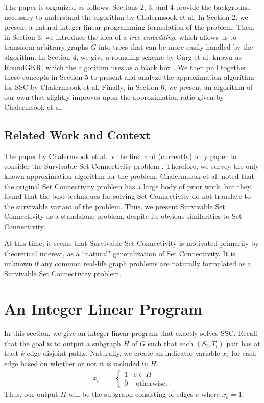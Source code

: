 \documentclass[12pt]{article}
\begin{document}
The paper is organized as follows. Sections 2, 3, and 4 provide the background necessary to understand the algorithm by Chalermsook et al. In Section 2, we present a natural integer linear programming formulation of the problem. Then, in Section 3, we introduce the idea of a \emph{tree embedding}, which allows us to transform arbitrary graphs $G$ into trees that can be more easily handled by the algorithm. In Section 4, we give a rounding scheme by Garg et al. known as RoundGKR, which the algorithm uses as a black box \cite{GKR}. We then pull together these concepts in Section 5 to present and analyze the approximation algorithm for SSC by Chalermsook et al. Finally, in Section 6, we present an algorithm of our own that slightly improves upon the approximation ratio given by Chalermsook et al.

\subsection{Related Work and Context}

The paper by Chalermsook et al. is the first and (currently) only paper to consider the Survivable Set Connectivity problem \cite{ssc}. Therefore, we survey the only known approximation algorithm for the problem. Chalermsook et al. noted that the original Set Connectivity problem has a large body of prior work, but they found that the best techniques for solving Set Connectivity do not translate to the survivable variant of the problem. Thus, we present Survivable Set Connectivity as a standalone problem, despite its obvious similarities to Set Connectivity.

At this time, it seems that Survivable Set Connectivity is motivated primarily by theoretical interest, as a ``natural" generalization of Set Connectivity. It is unknown if any common real-life graph problems are naturally formulated as a Survivable Set Connectivity problem.

\section{An Integer Linear Program}

In this section, we give an integer linear program that exactly solves SSC. Recall that the goal is to output a subgraph $H$ of $G$ such that each $(S_i,T_i)$ pair has at least $k$ edge disjoint paths. Naturally, we create an indicator variable $x_e$ for each edge based on whether or not it is included in $H$. 
\begin{align}
 x_e &= \left\{ \begin{array}{cc} 1 & e \in H \\
                                  0 & \text{ otherwise. } \end{array} \right.
\end{align}
Thus, our output $H$ will be the subgraph consisting of edges $e$ where $x_e = 1$. \\ \\
\end{document}
